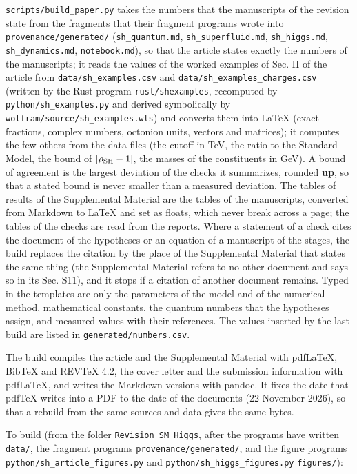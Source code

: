 \documentclass[
  10pt,
]{article}
\begin{document}
\texttt{scripts/build\_paper.py} takes the numbers that the manuscripts
of the revision state from the fragments that their fragment programs
wrote into \texttt{provenance/generated/} (\texttt{sh\_quantum.md},
\texttt{sh\_superfluid.md}, \texttt{sh\_higgs.md},
\texttt{sh\_dynamics.md}, \texttt{notebook.md}), so that the article
states exactly the numbers of the manuscripts; it reads the values of
the worked examples of Sec. II of the article from
\texttt{data/sh\_examples.csv} and
\texttt{data/sh\_examples\_charges.csv} (written by the Rust program
\texttt{rust/shexamples}, recomputed by \texttt{python/sh\_examples.py}
and derived symbolically by \texttt{wolfram/source/sh\_examples.wls})
and converts them into LaTeX (exact fractions, complex numbers, octonion
units, vectors and matrices); it computes the few others from the data
files (the cutoff in TeV, the ratio to the Standard Model, the bound of
\(\lvert\rho_{\rm SH}-1\rvert\), the masses of the constituents in GeV).
A bound of agreement is the largest deviation of the checks it
summarizes, rounded \textbf{up}, so that a stated bound is never smaller
than a measured deviation. The tables of results of the Supplemental
Material are the tables of the manuscripts, converted from Markdown to
LaTeX and set as floats, which never break across a page; the tables of
the checks are read from the reports. Where a statement of a check cites
the document of the hypotheses or an equation of a manuscript of the
stages, the build replaces the citation by the place of the Supplemental
Material that states the same thing (the Supplemental Material refers to
no other document and says so in its Sec. S11), and it stops if a
citation of another document remains. Typed in the templates are only
the parameters of the model and of the numerical method, mathematical
constants, the quantum numbers that the hypotheses assign, and measured
values with their references. The values inserted by the last build are
listed in \texttt{generated/numbers.csv}.

The build compiles the article and the Supplemental Material with
pdfLaTeX, BibTeX and REVTeX 4.2, the cover letter and the submission
information with pdfLaTeX, and writes the Markdown versions with pandoc.
It fixes the date that pdfTeX writes into a PDF to the date of the
documents (22 November 2026), so that a rebuild from the same sources
and data gives the same bytes.

To build (from the folder \texttt{Revision\_SM\_Higgs}, after the
programs have written \texttt{data/}, the fragment programs
\texttt{provenance/generated/}, and the figure programs
\texttt{python/sh\_article\_figures.py} and
\texttt{python/sh\_higgs\_figures.py} \texttt{figures/}):
\end{document}
